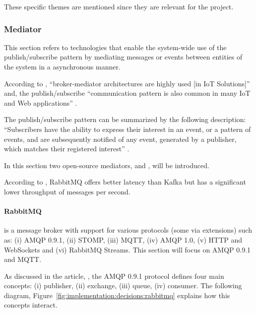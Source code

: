These specific themes are mentioned since they are relevant for the project.

\subsubsection{Mediator}
\label{subsubsec:stateofart:arch:infra:mediator}

This section refers to technologies that enable the system-wide use of the publish/subscribe pattern by mediating messages or events between entities of the system in a asynchronous manner.

According to \cite{DIAS2022100529}, ``broker-mediator architectures are highly used [in \gls{IoT} Solutions]'' and, the publish/subscribe ``communication pattern is also common in many IoT and Web applications'' \parencite{LAZIDIS2022100538}. 

The publish/subscribe pattern can be summarized by the following description: ``Subscribers have the ability to express their interest in an event, or a pattern of events, and are subsequently notified of any event, generated by a publisher, which matches their registered interest'' \parencite{10.1145857076.857078}.

In this section two open-source mediators,  and , will be introduced.

According to \cite{LAZIDIS2022100538}, RabbitMQ offers better latency than Kafka but has a significant lower throughput of messages per second.

\paragraph{RabbitMQ}
\label{par:stateofart:arch:infra:mediator:rabbitmq}

 is a message broker with support for various protocols (some via extensions) such as: (i) \gls{AMQP} 0.9.1, (ii) STOMP, (iii) \gls{MQTT}, (iv) \gls{AMQP} 1.0, (v) HTTP and WebSockets and (vi) RabbitMQ Streams. This section will focus on \gls{AMQP} 0.9.1 and \gls{MQTT}.

As discussed in the article, , the \gls{AMQP} 0.9.1 protocol defines four main concepts: (i) publisher, (ii) exchange, (iii) queue, (iv) consumer. The following diagram, Figure~\ref{fig:implementation:decisions:rabbitmq} explains how this concepts interact.

